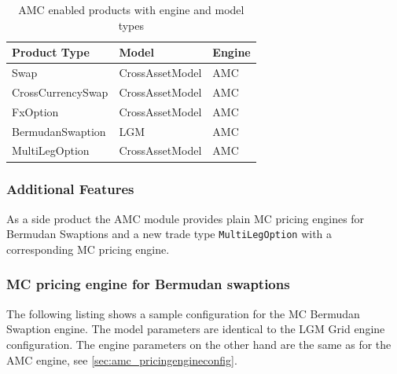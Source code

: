 \begin{table}[hbt]
  \begin{tabular}{l|l|l}
    Product Type & Model & Engine \\ \hline
    Swap & CrossAssetModel & AMC \\
    CrossCurrencySwap & CrossAssetModel & AMC \\
    FxOption & CrossAssetModel & AMC \\
    BermudanSwaption & LGM & AMC \\
    MultiLegOption & CrossAssetModel & AMC \\
  \end{tabular}
  \caption{AMC enabled products with engine and model types}
  \label{tbl:amcconfig}
\end{table}

\subsubsection*{Additional Features}
\label{sec:amc_sideproducts}

As a side product the AMC module provides plain MC pricing engines for Bermudan Swaptions and a new trade type
\verb+MultiLegOption+ with a corresponding MC pricing engine.

\subsubsection*{MC pricing engine for Bermudan swaptions}\label{sec:mc_bermudan_engine}

The following listing shows a sample configuration for the MC Bermudan Swaption engine. The model parameters are
identical to the LGM Grid engine configuration. The engine parameters on the other hand are the same as for the AMC
engine, see \ref{sec:amc_pricingengineconfig}.

